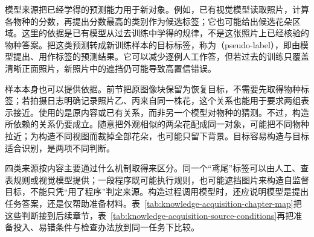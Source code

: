 模型来源把已经学得的预测能力用于新对象。例如，已有视觉模型读取照片，计算各物种的分数，再提出分数最高的类别作为候选标签；它也可能给出候选花朵区域。这里的依据是已有模型从过去训练中学得的规律，不是这张照片上已经核验的物种答案。把这类预测转成新训练样本的目标标签，称为（pseudo-label），即由模型提出、用作标签的预测结果。它可以减少逐例人工作答，但若过去的训练只覆盖清晰正面照片，新照片中的遮挡仍可能导致高置信错误。

样本本身也可以提供依据。前节把原图像块保留为恢复目标，不需要先取得物种标签；若拍摄日志明确记录照片乙、丙来自同一株花，这个关系也能用于要求两组表示接近。使用的是原内容或已有关系，而非另一个模型对物种的猜测。不过，构造所依赖的关系仍要成立。随意把外观相似的两朵花配成同一对象，可能把不同物种拉近；为构造不同视图而裁掉全部花朵，也可能只留下背景。目标容易构造与目标适合识别，是两项不同判断。

四类来源按内容主要通过什么机制取得来区分。同一个“鸢尾”标签可以由人工、查表规则或视觉模型提供；一段程序既可能执行规则，也可能遮挡图片来构造自监督目标，不能只凭“用了程序”判定来源。构造过程调用模型时，还应说明模型是提出任务答案，还是仅帮助准备材料。表~\ref{tab:knowledge-acquisition-chapter-map}把这些判断接到后续章节，表~\ref{tab:knowledge-acquisition-source-conditions}再把准备投入、易错条件与检查办法放到同一任务下比较。

